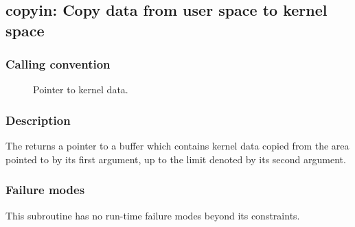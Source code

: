\clearpage
{}
{}
\label{subr:copyin}
\subsection*{copyin: Copy data from user space to kernel space}

\subsubsection*{Calling convention}

\begin{description}
\item[] Pointer to kernel data.
\end{description}

\subsubsection*{Description}

The  returns a pointer to a buffer which contains
kernel data copied from the area pointed to by its first argument, up
to the limit denoted by its second argument.

\subsubsection*{Failure modes}

This subroutine has no run-time failure modes beyond its constraints.
